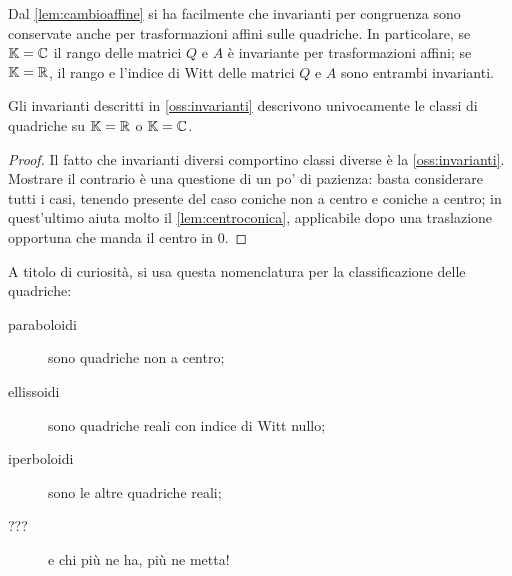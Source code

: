 \documentclass[a4paper,12pt]{article}
\begin{document}
\begin{remark}\label{oss:invarianti}
	Dal \cref{lem:cambioaffine} si ha facilmente che invarianti per congruenza sono conservate anche per trasformazioni affini sulle quadriche.
	In particolare, se $\mathbb K = \mathbb C$ il rango delle matrici $Q$ e $A$ è invariante per trasformazioni affini;
	se $\mathbb K= \mathbb R$, il rango e l'indice di Witt delle matrici $Q$ e $A$ sono entrambi invarianti.
\end{remark}

\begin{theorem}
	Gli invarianti descritti in \cref{oss:invarianti} descrivono univocamente le classi di quadriche su $\mathbb K=\mathbb R$ o $\mathbb K=\mathbb C$.
\end{theorem}
\begin{proof}
	Il fatto che invarianti diversi comportino classi diverse è la \cref{oss:invarianti}.
	Mostrare il contrario è una questione di un po' di pazienza: basta considerare tutti i casi, tenendo presente del caso coniche non a centro
	e coniche a centro; in quest'ultimo aiuta molto il \cref{lem:centroconica}, applicabile dopo una traslazione opportuna che manda il centro
	in $0$.
\end{proof}

\begin{remark}
	A titolo di curiosità, si usa questa nomenclatura per la classificazione delle quadriche:
	\begin{description}
	 \item[paraboloidi] sono quadriche non a centro;
	 \item[ellissoidi] sono quadriche reali con indice di Witt nullo;
	 \item[iperboloidi] sono le altre quadriche reali;
	 \item[???] e chi più ne ha, più ne metta!
	\end{description}
\end{remark}
\end{document}
